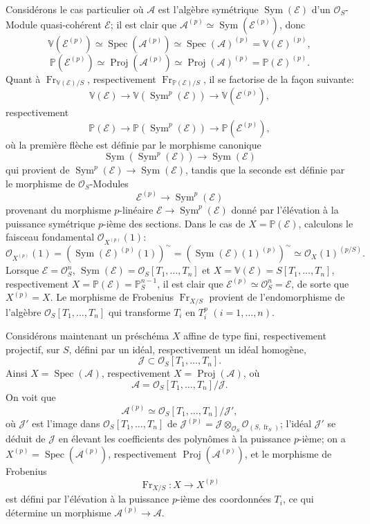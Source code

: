 \documentclass[11pt]{article}
\DeclareMathOperator{\Spec}{Spec}
\providecommand{\OO}{\mathcal{O}}
\providecommand{\cE}{\mathcal E}
\providecommand{\Spec}{\operatorname{Spec}}
\providecommand{\Sym}{\operatorname{Sym}}
\providecommand{\Spec}{\operatorname{Spec}}
\providecommand{\Spec}{\operatorname{Spec}}
\providecommand{\fr}{\operatorname{fr}}
\providecommand{\Fr}{\operatorname{Fr}}
\providecommand{\Proj}{\operatorname{Proj}}
\providecommand{\Sym}{\operatorname{Sym}}
\providecommand{\JJ}{\mathcal J}
\providecommand{\Fr}{\operatorname{Fr}}
\providecommand{\fr}{\operatorname{fr}}
\providecommand{\Spec}{\operatorname{Spec}}
\begin{document}
Considérons le cas particulier où $\mathcal{A}$ est l'algèbre symétrique $\Sym(\cE)$ d'un $\OO_S$-Module quasi-cohérent $\cE$; il est clair que $\mathcal{A}^{(p)}\simeq\Sym(\cE^{(p)})$, donc
\[
\mathbb V(\cE^{(p)})\simeq\Spec(\mathcal{A}^{(p)})\simeq\Spec(\mathcal{A})^{(p)}=\mathbb V(\cE)^{(p)},
\]
\[
\mathbb P(\cE^{(p)})\simeq\Proj(\mathcal{A}^{(p)})\simeq\Proj(\mathcal{A})^{(p)}=\mathbb P(\cE)^{(p)}.
\]
Quant à $\Fr_{\mathbb V(\cE)/S}$, respectivement $\Fr_{\mathbb P(\cE)/S}$, il se factorise de la façon suivante:
\[
\mathbb V(\cE)\longrightarrow \mathbb V(\Sym^p(\cE))\longrightarrow \mathbb V(\cE^{(p)}),
\]
respectivement
\[
\mathbb P(\cE)\longrightarrow \mathbb P(\Sym^p(\cE))\longrightarrow \mathbb P(\cE^{(p)}),
\]
où la première flèche est définie par le morphisme canonique
\[
\Sym(\Sym^p(\cE))\longrightarrow \Sym(\cE)
\]
qui provient de $\Sym^p(\cE)\to\Sym(\cE)$, tandis que la seconde est définie par le morphisme de $\OO_S$-Modules
\[
\cE^{(p)}\longrightarrow \Sym^p(\cE)
\]
provenant du morphisme $p$-linéaire $\cE\to\Sym^p(\cE)$ donné par l'élévation à la puissance symétrique $p$-ième des sections. Dans le cas de $X=\mathbb P(\cE)$, calculons le faisceau fondamental $\OO_{X^{(p)}}(1)$:
\[
\OO_{X^{(p)}}(1)=(\Sym(\cE)^{(p)}(1))^{\sim}
=(\Sym(\cE)(1)^{(p)})^{\sim}
\simeq \OO_X(1)^{(p/S)}.
\]
Lorsque $\cE=\OO_S^n$, $\Sym(\cE)=\OO_S[T_1,\ldots,T_n]$ et $X=\mathbb V(\cE)=S[T_1,\ldots,T_n]$, respectivement $X=\mathbb P(\cE)=\mathbb P_S^{n-1}$, il est clair que $\cE^{(p)}\simeq\OO_S^n=\cE$, de sorte que $X^{(p)}=X$. Le morphisme de Frobenius $\Fr_{X/S}$ provient de l'endomorphisme de l'algèbre $\OO_S[T_1,\ldots,T_n]$ qui transforme $T_i$ en $T_i^p$ $(i=1,\ldots,n)$.

Considérons maintenant un préschéma $X$ affine de type fini, respectivement projectif, sur $S$, défini par un idéal, respectivement un idéal homogène,
\[
\JJ\subset \OO_S[T_1,\ldots,T_n].
\]
Ainsi $X=\Spec(\mathcal{A})$, respectivement $X=\Proj(\mathcal{A})$, où
\[
\mathcal{A}=\OO_S[T_1,\ldots,T_n]/\JJ.
\]
On voit que
\[
\mathcal{A}^{(p)}\simeq \OO_S[T_1,\ldots,T_n]/\JJ',
\]
où $\JJ'$ est l'image dans $\OO_S[T_1,\ldots,T_n]$ de $\JJ^{(p)}=\JJ\otimes_{\OO_S}\OO_{(S,\fr_S)}$; l'idéal $\JJ'$ se déduit de $\JJ$ en élevant les coefficients des polynômes à la puissance $p$-ième; on a $X^{(p)}=\Spec(\mathcal{A}^{(p)})$, respectivement $\Proj(\mathcal{A}^{(p)})$, et le morphisme de Frobenius
\[
\Fr_{X/S}:X\longrightarrow X^{(p)}
\]
est défini par l'élévation à la puissance $p$-ième des coordonnées $T_i$, ce qui détermine un morphisme $\mathcal{A}^{(p)}\to\mathcal{A}$.
\end{document}
